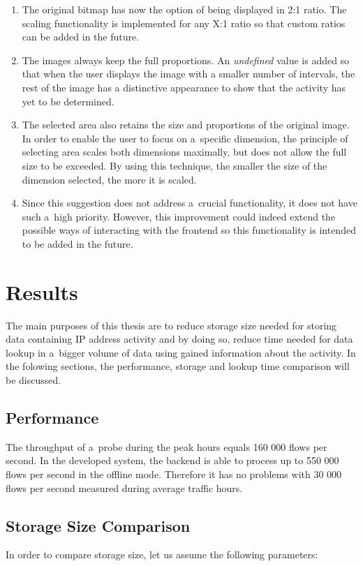 \begin{enumerate}
   \item The original bitmap has now the option of being displayed in
   2:1 ratio. The scaling functionality is implemented for any X:1 ratio
   so that custom ratios can be added in the future.
   \item The images always keep the full proportions. An \textit{undefined}
   value is added so that when the user displays the image with a smaller
   number of intervals, the rest of the image has a distinctive appearance
   to show that the activity has yet to be determined.
   \item The selected area also retains the size and proportions of the original
   image. In order to enable the user to focus on a~specific dimension, the
   principle of selecting area scales both dimensions maximally, but does not
   allow the full size to be exceeded. By using this technique, the smaller the size
   of the dimension selected, the more it is scaled.
   \item Since this suggestion does not address a~crucial functionality,
   it does not have such a~high priority. However, this improvement could
   indeed extend the possible ways of interacting with the frontend so this
   functionality is intended to be added in the future.
\end{enumerate}

\section{Results}\label{sec:results}
The main purposes of this thesis are to reduce storage size needed for
storing data containing IP address activity and by doing so, reduce
time needed for data lookup in a~bigger volume of data using gained information
about the activity.
In the folowing sections, the performance, storage and lookup time comparison will be discussed.

\subsection{Performance}
The throughput of a~probe during the peak hours equals 160 000 flows per second.
In the developed system, the backend is able to process up to 550 000 flows
per second in the offline mode. Therefore it has no problems with
30 000 flows per second measured during average traffic hours.

\subsection{Storage Size Comparison}\label{sec:storage_cmp}
In order to compare storage size, let us assume the following parameters:

